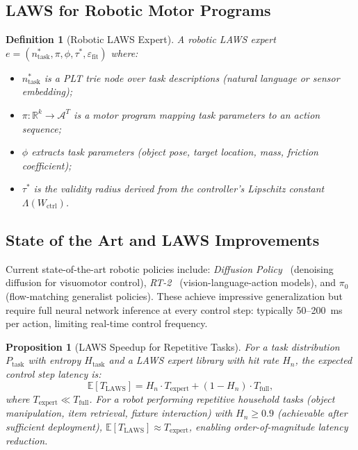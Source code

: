 \documentclass[11pt]{article}
\newtheorem{definition}{Definition}
\newtheorem{proposition}{Proposition}
\begin{document}
\subsection{LAWS for Robotic Motor Programs}

\begin{definition}[Robotic LAWS Expert]
A \emph{robotic LAWS expert} $e = (n^*_{\mathrm{task}}, \pi, \phi, \tau^*, \varepsilon_{\mathrm{fit}})$
where:
\begin{itemize}[leftmargin=2em]
  \item $n^*_{\mathrm{task}}$ is a PLT trie node over task descriptions
        (natural language or sensor embedding);
  \item $\pi: \mathbb{R}^k \to \mathcal{A}^T$ is a motor program mapping
        task parameters to an action sequence;
  \item $\phi$ extracts task parameters (object pose, target location, mass,
        friction coefficient);
  \item $\tau^*$ is the validity radius derived from the controller's
        Lipschitz constant $\Lambda(W_{\mathrm{ctrl}})$.
\end{itemize}
\end{definition}

\subsection{State of the Art and LAWS Improvements}

Current state-of-the-art robotic policies include:
\emph{Diffusion Policy}~\cite{chi2023diffusion} (denoising diffusion for
visuomotor control), \emph{RT-2}~\cite{brohan2023rt2} (vision-language-action
models), and \emph{$\pi_0$}~\cite{black2024pi0} (flow-matching generalist
policies).  These achieve impressive generalization but require full neural
network inference at every control step: typically 50--200~ms per action,
limiting real-time control frequency.

\begin{proposition}[LAWS Speedup for Repetitive Tasks]
\label{prop:robotics_speedup}
For a task distribution $P_{\mathrm{task}}$ with entropy $H_{\mathrm{task}}$
and a LAWS expert library with hit rate $H_n$, the expected control step
latency is:
\[
  \mathbb{E}[T_{\mathrm{LAWS}}]
  = H_n \cdot T_{\mathrm{expert}} + (1-H_n) \cdot T_{\mathrm{full}},
\]
where $T_{\mathrm{expert}} \ll T_{\mathrm{full}}$.  For a robot performing
repetitive household tasks (object manipulation, item retrieval, fixture
interaction) with $H_n \geq 0.9$ (achievable after sufficient deployment),
$\mathbb{E}[T_{\mathrm{LAWS}}] \approx T_{\mathrm{expert}}$, enabling
order-of-magnitude latency reduction.
\end{proposition}
\end{document}

